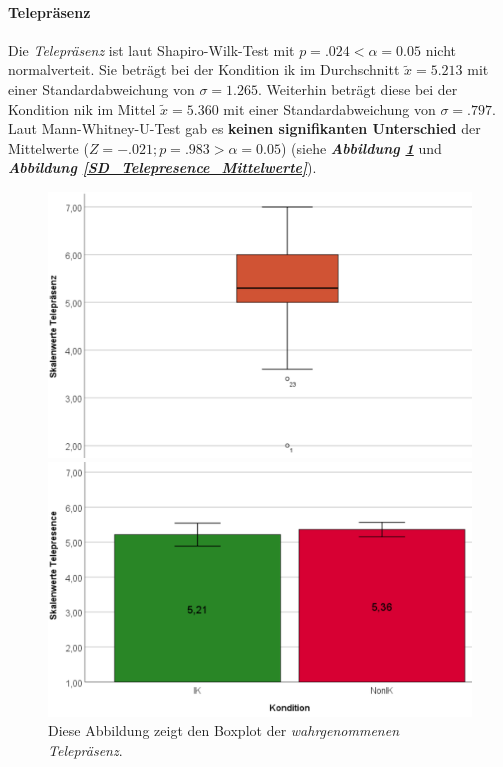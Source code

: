 \documentclass[a4paper,11pt]{article}%
\renewcommand{\\}{\vspace*{0.5\baselineskip} \newline}
\begin{document}
\paragraph{Telepräsenz} 
Die \textit{Telepräsenz} ist laut Shapiro-Wilk-Test mit $p = .024 < \alpha = 0.05$ nicht normalverteit. 
Sie beträgt bei der Kondition \ac{ik} im Durchschnitt $\tilde x = 5.213$ mit einer Standardabweichung von $\sigma = 1.265$.
Weiterhin beträgt diese bei der Kondition \ac{nik} im Mittel $\tilde x = 5.360$ mit einer Standardabweichung von $\sigma = .797$. 
Laut Mann-Whitney-U-Test gab es \textbf{keinen signifikanten Unterschied} der Mittelwerte ($ Z = -.021; p = .983 > \alpha = 0.05$) (siehe \textbf{\textit{Abbildung \ref{SD_Telepresence}}} und \textbf{\textit{Abbildung \ref{SD_Telepresence_Mittelwerte}}}).

	\begin{figure}[H]
   \begin{minipage}[t]{.5\linewidth} %
      \includegraphics[width=\linewidth]{Abbildungen/AuswertungDiagramme/BP_Telepresence.png}
      \caption[Boxplot der \textit{wahrgenommenen Telepräsenz}]{Diese Abbildung zeigt den Boxplot der \textit{wahrgenommenen Telepräsenz}.}
            \label{SD_Telepresence}
   \end{minipage}
   \hspace{.02\linewidth}%
   \begin{minipage}[t]{.5\linewidth} %
     \includegraphics[width=\linewidth]{Abbildungen/AuswertungDiagramme/SD_Telepresence_Mittelwerte.png}

\end{minipage}
\end{figure}
\end{document}

